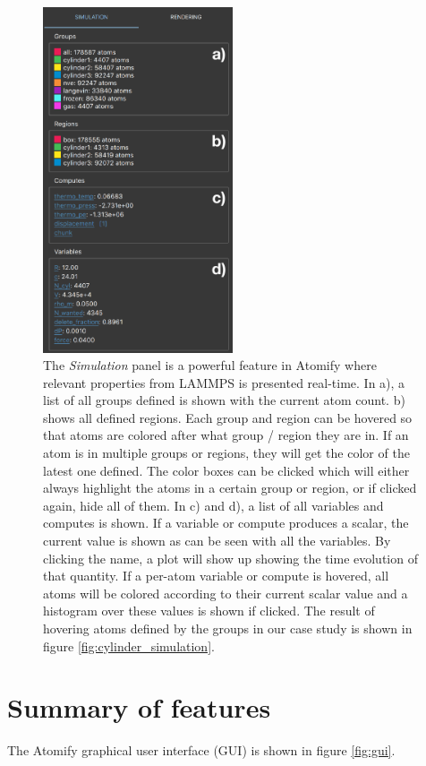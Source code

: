 \documentclass[12pt,a4paper,final]{iopart}
\begin{document}
\begin{figure}[htp!]
	\centering
	\includegraphics[width=0.5\textwidth]{figures/rightbar.pdf}
	\caption{
		The \textit{Simulation} panel is a powerful feature in Atomify where relevant
		properties from LAMMPS is presented real-time.
		In a), a list of all groups defined is shown with the current atom count.
		b) shows all defined regions. Each group and region can be hovered so that atoms
		are colored after what group / region they are in. If an atom is in multiple
		groups or regions, they will get the color of the latest one defined.
		The color boxes can be clicked which will either always highlight the atoms in a certain group or region,
		or if clicked again, hide all of them.
		In c) and d), a list of all variables and computes is shown. If a variable or compute
		produces a scalar, the current value is shown as can be seen with all the variables.
		By clicking the name, a plot will show up showing the time evolution of that quantity.
		If a per-atom variable or compute is hovered, all atoms will be colored according to their
		current scalar value and a histogram over these values is shown if clicked.
		The result of hovering atoms defined by the groups in our case study is shown in figure \ref{fig:cylinder_simulation}.
    }
	\label{fig:rightbar}
\end{figure}

\section{\label{sec:features}Summary of features}
The Atomify graphical user interface (GUI) is shown in figure \ref{fig:gui}.
\end{document}
